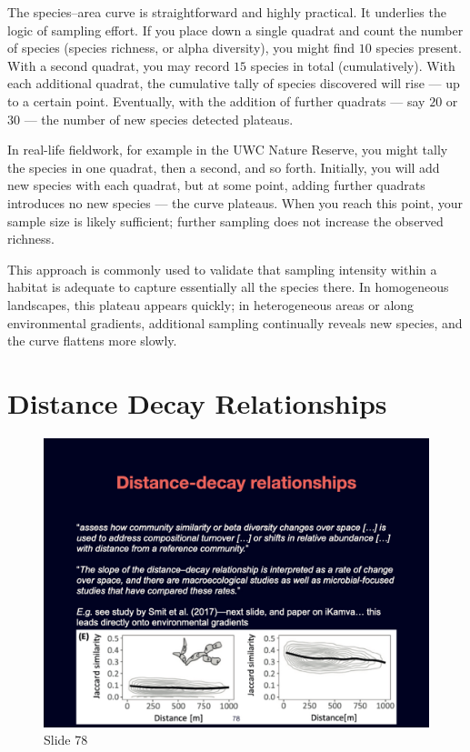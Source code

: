 \documentclass[
  10pt,
]{book}
\begin{document}
The species--area curve is straightforward and highly practical. It
underlies the logic of sampling effort. If you place down a single
quadrat and count the number of species (species richness, or alpha
diversity), you might find \(10\) species present. With a second
quadrat, you may record \(15\) species in total (cumulatively). With
each additional quadrat, the cumulative tally of species discovered will
rise --- up to a certain point. Eventually, with the addition of further
quadrats --- say \(20\) or \(30\) --- the number of new species detected
plateaus.

In real-life fieldwork, for example in the UWC Nature Reserve, you might
tally the species in one quadrat, then a second, and so forth.
Initially, you will add new species with each quadrat, but at some
point, adding further quadrats introduces no new species --- the curve
plateaus. When you reach this point, your sample size is likely
sufficient; further sampling does not increase the observed richness.

This approach is commonly used to validate that sampling intensity
within a habitat is adequate to capture essentially all the species
there. In homogeneous landscapes, this plateau appears quickly; in
heterogeneous areas or along environmental gradients, additional
sampling continually reveals new species, and the curve flattens more
slowly.

\section{Distance Decay
Relationships}\label{distance-decay-relationships}

\begin{figure}[ht]
\centering
\includegraphics[width=0.8\linewidth]{../images/BDC334/BDC334-078.jpeg}
\caption*{Slide 78}
\end{figure}
\end{document}
